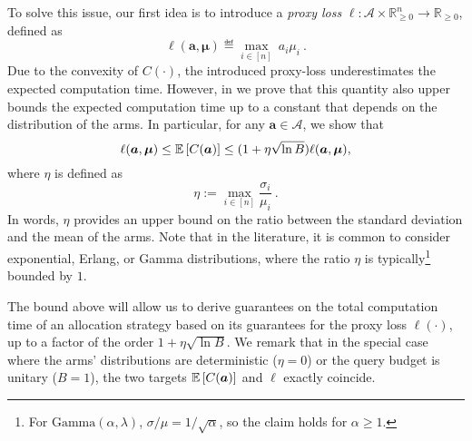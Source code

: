 To solve this issue, our first idea is to introduce a \emph{proxy loss} $\ell : \mathcal{A}\times \mathbb{R}_{\ge 0}^n \to \mathbb{R}_{\ge 0}$, defined as
\begin{equation}\label{eq:def_l}
	\ell(\bm{a},\bm{\mu}) \eqdef  \max_{i \in [n]} \  a_{i} \mu_i~.
\end{equation}
Due to the convexity of $C(\cdot)$, the introduced proxy-loss underestimates the expected computation time.
However, in  we prove that this quantity also upper bounds the expected computation time up to a constant that depends on the distribution of the arms. In particular, for any $\bm{a} \in \mathcal{A}$, we show that
\begin{equation}\label{eq:enc}
	\ell(\bm{a}, \bm{\mu}) \le \mathbb{E}\left[C(\bm{a})\right] \le (1+\eta\sqrt{\ln B}) \ell(\bm{a}, \bm{\mu}),
\end{equation}
where $\eta$ is defined as
\begin{equation}\label{def:eta}
	\eta := \max_{i \in [n]} \frac{\sigma_i}{\mu_i}~.
\end{equation}
In words, $\eta$ provides an upper bound on the ratio between the standard deviation and the mean of the arms.
Note that in the literature, it is common to consider exponential, Erlang, or Gamma distributions, where the ratio $\eta$ is typically\footnote{For $\mathrm{Gamma}(\alpha, \lambda)$, $\sigma / \mu = 1 / \sqrt{\alpha}$, so the claim holds for $\alpha \geq 1$.} bounded by $1$.

The bound above will allow us to derive guarantees on the total computation time of an allocation strategy based on its guarantees for the proxy loss $ \ell(\cdot)$, up to a factor of the order $1 + \eta\sqrt{\ln B}$.
We remark that in the special case where the arms' distributions are deterministic ($\eta = 0$) or the query budget is unitary ($B = 1$), the two targets $\mathbb{E}\left[C(\bm{a})\right]$ and $\ell$ exactly coincide.



